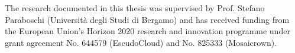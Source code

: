 The research documented in this thesis was supervised by Prof. Stefano Paraboschi (Universit\`a degli Studi di Bergamo) and has received funding from the European Union's Horizon 2020 research and innovation programme under grant agreement No. 644579 (EscudoCloud) and No. 825333 (Mosaicrown).